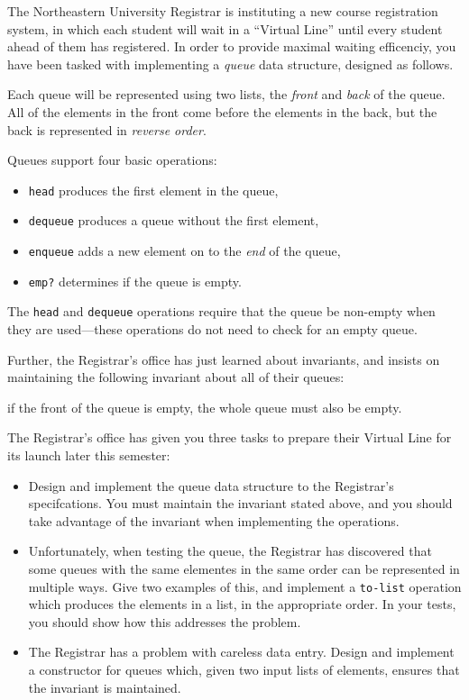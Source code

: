 \documentclass[12pt]{article}                   %
\def\pts#1{\marginpar{\footnotesize \raggedright  \fbox{#1 {\sc Points}}}}
\newenvironment{solution}{}{}
\begin{document}
\begin{problem} \pts{6}

The Northeastern University Registrar is instituting a new
course registration system, in which each student will wait in a
``Virtual Line'' until every student ahead of them has registered.  In
order to provide maximal waiting efficenciy, you have been tasked with
implementing a \emph{queue} data structure, designed as follows.  

Each queue will be represented using two lists, the \emph{front} and
\emph{back} of the queue.  All of the elements in the front come
before the elements in the back, but the back is represented in
\emph{reverse order}.  

Queues support four basic operations:
\begin{itemize}
\item \texttt{head} produces the first element in the queue,
\item \texttt{dequeue} produces a queue without the first element,
\item \texttt{enqueue} adds a new element on to the \emph{end} of the
  queue,
\item \texttt{emp?} determines if the queue is empty.
\end{itemize}
The \texttt{head} and \texttt{dequeue} operations require that the
queue be non-empty when they are used---these operations do not need
to check for an empty queue.

Further, the Registrar's office has just learned about invariants, and
insists on maintaining the following invariant about all of their
queues:  
\begin{indent}
  if the front of the queue is empty, the whole queue must also be empty.
\end{indent} 

The Registrar's office has given you three tasks to prepare their
Virtual Line for its launch later this semester:

\begin{itemize}
\item Design and implement the queue data structure to the Registrar's
  specifcations.  You must maintain the invariant stated above, and
  you should take advantage of the invariant when implementing the
  operations.
\item Unfortunately, when testing the queue, the Registrar has
  discovered that some queues with the same elementes in the same
  order can be represented in multiple ways.  Give two examples of
  this, and implement a \texttt{to-list} operation which produces the
  elements in a list, in the appropriate order.  In your tests, you
  should show how this addresses the problem.
\item The Registrar has a problem with careless data entry.  Design
  and implement a constructor for queues which, given two input lists
  of elements, ensures that the invariant is maintained.  
\end{itemize}

\begin{solution}
\end{solution}
\end{problem}
\end{document}
